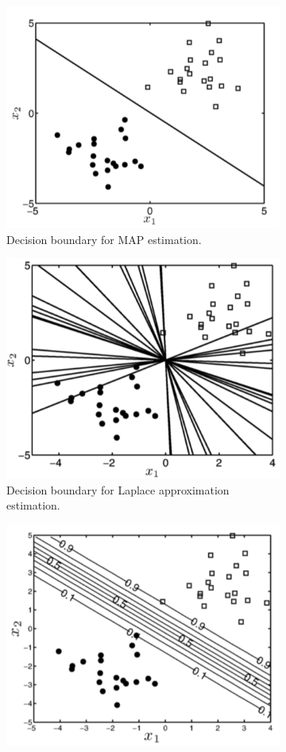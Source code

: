 \begin{figure}
\begin{subfigure}[t]{0.5\textwidth}
\centering
\includegraphics[width=0.85\linewidth]{img/MAP1}
\caption{Decision boundary for MAP estimation.}
\label{MAP1}
\end{subfigure}
\hfill
\begin{subfigure}[t]{0.505\textwidth}
\centering
\includegraphics[width=0.8\linewidth]{img/laplace1}
\caption{Decision boundary for Laplace approximation estimation.}
\label{laplace1}
\end{subfigure}
\begin{subfigure}[t]{0.5\textwidth}
\centering
\includegraphics[width=0.8\linewidth]{img/MAP2}

\end{subfigure}
\end{figure}
